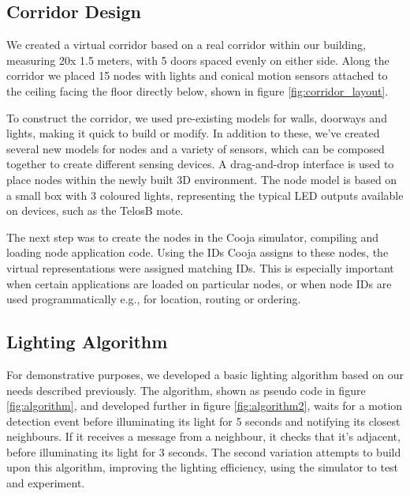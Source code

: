 \subsection{Corridor Design}
\label{sub:Constructing the corridor}
We created a virtual corridor based on a real corridor within our building, measuring 20x 1.5 meters, with 5 doors spaced evenly on either side. Along the corridor we placed 15 nodes with lights and conical motion sensors attached to the ceiling facing the floor directly below, shown in figure \ref{fig:corridor_layout}.

To construct the corridor, we used pre-existing models for walls, doorways and lights, making it quick to build or modify. In addition to these, we've created several new models for nodes and a variety of sensors, which can be composed together to create different sensing devices. A drag-and-drop interface is used to place nodes within the newly built 3D environment. The node model is based on a small box with 3 coloured lights, representing the typical LED outputs available on devices, such as the TelosB mote.

The next step was to create the nodes in the Cooja simulator, compiling and loading node application code. Using the IDs Cooja assigns to these nodes, the virtual representations were assigned matching IDs. This is especially important when certain applications are loaded on particular nodes, or when node IDs are used programmatically e.g., for location, routing or ordering.

\subsection{Lighting Algorithm}
\label{sub:Lighting Algorithm}
For demonstrative purposes, we developed a basic lighting algorithm based on our needs described previously. The algorithm, shown as pseudo code in figure \ref{fig:algorithm}, and developed further in figure \ref{fig:algorithm2}, waits for a motion detection event before illuminating its light for 5 seconds and notifying its closest neighbours. If it receives a message from a neighbour, it checks that it's adjacent, before illuminating its light for 3 seconds. The second variation attempts to build upon this algorithm, improving the lighting efficiency, using the simulator to test and experiment.

